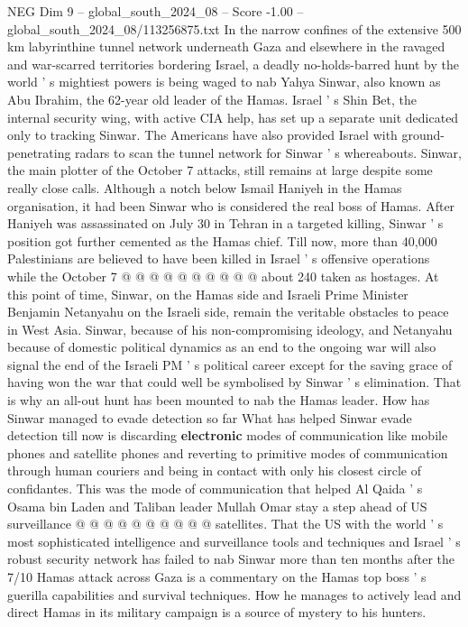 \begin{textsample}{NEG Dim 9 – global\_south\_2024\_08 – Score -1.00 – global\_south\_2024\_08/113256875.txt}  \label{ex:f9_neg_342}
In the narrow confines of the extensive 500 km labyrinthine tunnel network underneath Gaza and elsewhere in the ravaged and war-scarred territories bordering Israel, a deadly no-holds-barred hunt by the world ' s mightiest powers is being waged to nab Yahya Sinwar, also known as Abu Ibrahim, the 62-year old leader of the Hamas.
Israel ' s Shin Bet, the internal security wing, with active CIA help, has set up a separate unit dedicated only to tracking Sinwar.
The Americans have also provided Israel with ground-penetrating radars to scan the tunnel network for Sinwar ' s whereabouts.
Sinwar, the main plotter of the October 7 attacks, still remains at large despite some really close calls.
Although a notch below Ismail Haniyeh in the Hamas organisation, it had been Sinwar who is considered the real boss of Hamas.
After Haniyeh was assassinated on July 30 in Tehran in a targeted killing, Sinwar ' s position got further cemented as the Hamas chief.
Till now, more than 40,000 Palestinians are believed to have been killed in Israel ' s offensive operations while the October 7 @ @ @ @ @ @ @ @ @ @ about 240 taken as hostages.
At this point of time, Sinwar, on the Hamas side and Israeli Prime Minister Benjamin Netanyahu on the Israeli side, remain the veritable obstacles to peace in West Asia.
Sinwar, because of his non-compromising ideology, and Netanyahu because of domestic political dynamics as an end to the ongoing war will also signal the end of the Israeli PM ' s political career except for the saving grace of having won the war that could well be symbolised by Sinwar ' s elimination.
That is why an all-out hunt has been mounted to nab the Hamas leader.
How has Sinwar managed to evade detection so far What has helped Sinwar evade detection till now is discarding \textbf{electronic} modes of communication like mobile phones and satellite phones and reverting to primitive modes of communication through human couriers and being in contact with only his closest circle of confidantes.
This was the mode of communication that helped Al Qaida ' s Osama bin Laden and Taliban leader Mullah Omar stay a step ahead of US surveillance @ @ @ @ @ @ @ @ @ @ satellites.
That the US with the world ' s most sophisticated intelligence and surveillance tools and techniques and Israel ' s robust security network has failed to nab Sinwar more than ten months after the 7/10 Hamas attack across Gaza is a commentary on the Hamas top boss ' s guerilla capabilities and survival techniques.
How he manages to actively lead and direct Hamas in its military campaign is a source of mystery to his hunters.

\end{textsample}
